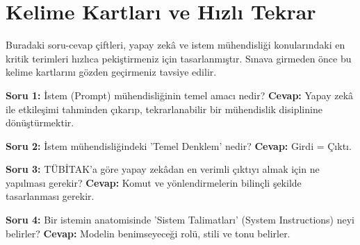 \documentclass[11pt,a4paper,openany]{book}
\begin{document}
\newpage
\chapter{Kelime Kartları ve Hızlı Tekrar}
Buradaki soru-cevap çiftleri, yapay zekâ ve istem mühendisliği konularındaki en kritik terimleri hızlıca pekiştirmeniz için tasarlanmıştır. Sınava girmeden önce bu kelime kartlarını gözden geçirmeniz tavsiye edilir.

\needspace{3.5cm}
\begin{tcolorbox}[colback=white, colframe=secondarycolor!50!black, arc=1.2mm, boxrule=0.8pt, top=8pt, bottom=8pt, left=12pt, right=12pt, segmentation style={dashed, secondarycolor!30, line width=0.8pt}]
    \noindent\textbf{\color{red!80!black}\sffamily Soru 1:} İstem (Prompt) mühendisliğinin temel amacı nedir?
\tcblower
    \noindent\textbf{\color{green!50!black}\sffamily Cevap:} Yapay zekâ ile etkileşimi tahminden çıkarıp, tekrarlanabilir bir mühendislik disiplinine dönüştürmektir.
\end{tcolorbox}
\vspace{6pt}
\needspace{3.5cm}
\begin{tcolorbox}[colback=white, colframe=secondarycolor!50!black, arc=1.2mm, boxrule=0.8pt, top=8pt, bottom=8pt, left=12pt, right=12pt, segmentation style={dashed, secondarycolor!30, line width=0.8pt}]
    \noindent\textbf{\color{red!80!black}\sffamily Soru 2:} İstem mühendisliğindeki 'Temel Denklem' nedir?
\tcblower
    \noindent\textbf{\color{green!50!black}\sffamily Cevap:} Girdi = Çıktı.
\end{tcolorbox}
\vspace{6pt}
\needspace{3.5cm}
\begin{tcolorbox}[colback=white, colframe=secondarycolor!50!black, arc=1.2mm, boxrule=0.8pt, top=8pt, bottom=8pt, left=12pt, right=12pt, segmentation style={dashed, secondarycolor!30, line width=0.8pt}]
    \noindent\textbf{\color{red!80!black}\sffamily Soru 3:} TÜBİTAK'a göre yapay zekâdan en verimli çıktıyı almak için ne yapılması gerekir?
\tcblower
    \noindent\textbf{\color{green!50!black}\sffamily Cevap:} Komut ve yönlendirmelerin bilinçli şekilde tasarlanması gerekir.
\end{tcolorbox}
\vspace{6pt}
\needspace{3.5cm}
\begin{tcolorbox}[colback=white, colframe=secondarycolor!50!black, arc=1.2mm, boxrule=0.8pt, top=8pt, bottom=8pt, left=12pt, right=12pt, segmentation style={dashed, secondarycolor!30, line width=0.8pt}]
    \noindent\textbf{\color{red!80!black}\sffamily Soru 4:} Bir istemin anatomisinde 'Sistem Talimatları' (System Instructions) neyi belirler?
\tcblower
    \noindent\textbf{\color{green!50!black}\sffamily Cevap:} Modelin benimseyeceği rolü, stili ve tonu belirler.
\end{tcolorbox}
\end{document}
